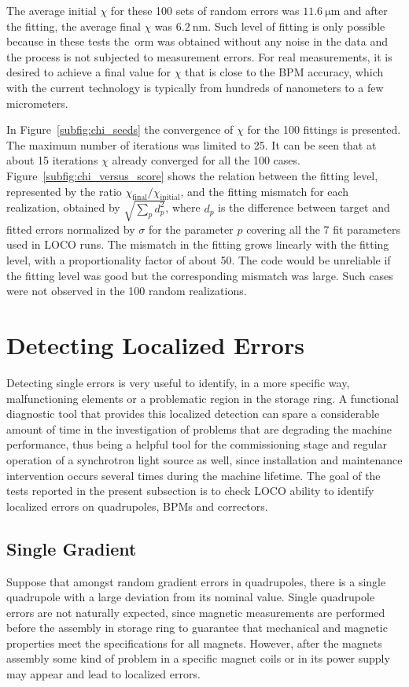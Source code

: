 The average initial $\chi$ for these 100 sets of random errors was $\SI{11.6}{\micro\meter}$ and after the fitting, the average final $\chi$ was $\SI{6.2}{\nano\meter}$. Such level of fitting is only possible because in these tests the~\gls{orm} was obtained without any noise in the data and the process is not subjected to measurement errors. For real measurements, it is desired to achieve a final value for $\chi$ that is close to the BPM accuracy, which with the current technology is typically from hundreds of nanometers to a few micrometers.

In Figure~\ref{subfig:chi_seeds} the convergence of $\chi$ for the 100 fittings is presented. The maximum number of iterations was limited to 25. It can be seen that at about 15 iterations $\chi$ already converged for all the 100 cases. Figure~\ref{subfig:chi_versus_score} shows the relation between the fitting level, represented by the ratio $\chi_{\mathrm{final}}/\chi_{\mathrm{initial}}$, and the fitting mismatch for each realization, obtained by $\sqrt{\sum_{p}d_p^2}$, where $d_p$ is the difference between target and fitted errors normalized by $\sigma$ for the parameter $p$ covering all the 7 fit parameters used in LOCO runs. The mismatch in the fitting grows linearly with the fitting level, with a proportionality factor of about 50. The code would be unreliable if the fitting level was good but the corresponding mismatch was large. Such cases were not observed in the 100 random realizations.
\section{Detecting Localized Errors}
Detecting single errors is very useful to identify, in a more specific way, malfunctioning elements or a problematic region in the storage ring. A functional diagnostic tool that provides this localized detection can spare a considerable amount of time in the investigation of problems that are degrading the machine performance, thus being a helpful tool for the commissioning stage and regular operation of a synchrotron light source as well, since installation and maintenance intervention occurs several times during the machine lifetime. The goal of the tests reported in the present subsection is to check LOCO ability to identify localized errors on quadrupoles, BPMs and correctors. 

\subsection{Single Gradient}
Suppose that amongst random gradient errors in quadrupoles, there is a single quadrupole with a large deviation from its nominal value. Single quadrupole errors are not naturally expected, since magnetic measurements are performed before the assembly in storage ring to guarantee that mechanical and magnetic properties meet the specifications for all magnets. However, after the magnets assembly some kind of problem in a specific magnet coils or in its power supply may appear and lead to localized errors.

